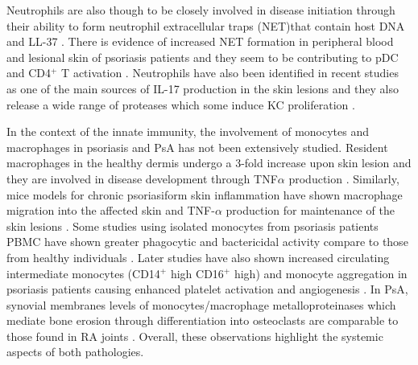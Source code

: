 Neutrophils are also though to be closely involved in disease initiation through their ability to form neutrophil extracellular traps (NET)that contain host DNA and LL-37 \parencite{Hu2016}. There is evidence of increased NET formation in peripheral blood and lesional skin of psoriasis patients and they seem to be contributing to pDC and CD4$^+$ T activation \parencite{Hu2016}. Neutrophils have also been identified in recent studies as one of the main sources of IL-17 production in the skin lesions \parencite{Lin2011} and they also release a wide range of proteases which some induce KC proliferation \parencite{Mahil2006}.

In the context of the innate immunity, the involvement of monocytes and macrophages in psoriasis and PsA has not been extensively studied. Resident macrophages in the healthy dermis undergo a 3-fold increase upon skin lesion and they are involved in disease development through TNF$\alpha$ production \parencite{Perera2012, Mahil2016}. Similarly, mice models for chronic psoriasiform skin inflammation have shown macrophage migration into the affected skin and TNF-$\alpha$ production for maintenance of the skin lesions \parencite{Stratis2006, Wang2006}. Some studies using isolated monocytes from psoriasis patients PBMC  have shown greater phagocytic and bactericidal activity compare to those from healthy individuals \parencite{Bar-Eli1979}. Later studies have also shown increased circulating intermediate monocytes (CD14$^{+}$ high CD16$^{+}$ high) and monocyte aggregation in psoriasis patients causing enhanced platelet activation and angiogenesis \parencite {Golden2015}. In PsA, synovial membranes levels of monocytes/macrophage metalloproteinases which mediate bone erosion through differentiation into osteoclasts are comparable to those found in RA joints \parencite{Hitchon2002}. Overall, these observations highlight the systemic aspects of both pathologies. 

%
%


